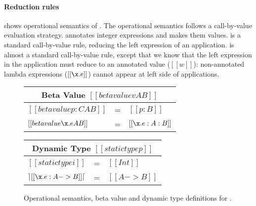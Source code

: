 \paragraph{Reduction rules}
 shows operational semantics of \cal.
The operational semantics follows a call-by-value evaluation strategy.
 annotates integer expressions and makes them
values.  is a standard call-by-value rule, reducing
the left expression of an application.
 is almost a standard call-by-value rule, except
that we know that the left expression in the application must reduce
to an annotated value ($[[w]]$): non-annotated lambda expressions
($[[\x.e]]$) cannot appear at left side of applications.

\begin{figure}[t]
  \begin{small}
    \centering
  \end{small}
  \begin{center}
  {\renewcommand{\arraystretch}{1.2}
    \begin{tabular}{|lcl|}
      \multicolumn{3}{c}{Beta Value $[[betavalue v A B]]$} \\
      \hline
      $[[betavalue p:C A B]]$ & = & $[[p:B]]$ \\
      $[[betavalue \x.e A B]]$ & = & $[[\x.e:A:B]]$ \\
      \hline
    \end{tabular} }
  \bigskip
  {\renewcommand{\arraystretch}{1.2}
    \begin{tabular}{|lcl|}
      \multicolumn{3}{c}{Dynamic Type $[[statictype p]]$} \\
      \hline
      $[[statictype i]]$ & = & $[[Int]]$ \\
      $\rceil [[\x.e: A -> B]] \lceil$ & = & $[[A -> B]]$ \\
      \hline
    \end{tabular} }
    \end{center}
  \caption{Operational semantics, beta value and dynamic type definitions for \cal.}
  \label{fig:union:os}
\end{figure}

